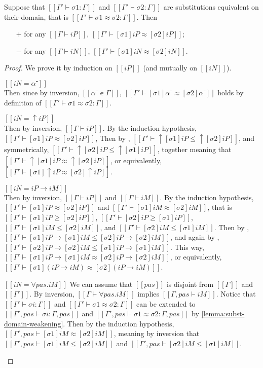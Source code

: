\begin{lemma}
  \label{lemma:equiv-subst-on-same-term}
  Suppose that $[[Γ' ⊢ σ1 : Γ]]$ and $[[Γ' ⊢ σ2 : Γ]]$
  are substitutions equivalent on their domain, that is $[[Γ' ⊢ σ1 ≈ σ2 : Γ]]$.
  Then
  \begin{itemize}
    \item[$+$] for any $[[Γ ⊢ iP]]$, $[[Γ' ⊢ [σ1]iP ≈ [σ2]iP]]$;
    \item[$-$] for any $[[Γ ⊢ iN]]$, $[[Γ' ⊢ [σ1]iN ≈ [σ2]iN]]$.
  \end{itemize}
\end{lemma}
\begin{proof}
  We prove it by induction on $[[iP]]$ (and mutually on $[[iN]]$).
  \begin{caseof}
    \item $[[iN = α⁻]]$\\
      Then since by inversion, $[[α⁻ ∊ Γ]]$, 
      $[[Γ' ⊢ [σ1]α⁻ ≈ [σ2]α⁻]]$ holds by definition of $[[Γ' ⊢ σ1 ≈ σ2 : Γ]]$.
    \item $[[iN = ↑iP]]$\\
      Then by inversion, $[[Γ ⊢ iP]]$.
      By the induction hypothesis, $[[Γ' ⊢ [σ1]iP ≈ [σ2]iP]]$, 
      Then by , 
      $[[Γ' ⊢ ↑[σ1]iP ≤ ↑[σ2]iP]]$, and symmetrically, $[[Γ' ⊢ ↑[σ2]iP ≤ ↑[σ1]iP]]$,
      together meaning that $[[Γ' ⊢ ↑[σ1]iP ≈ ↑[σ2]iP]]$,
      or equivalently, $[[Γ' ⊢ [σ1]↑iP ≈ [σ2]↑iP]]$.
    \item $[[iN = iP → iM]]$\\
      Then by inversion, $[[Γ ⊢ iP]]$ and $[[Γ ⊢ iM]]$.
      By the induction hypothesis, $[[Γ' ⊢ [σ1]iP ≈ [σ2]iP]]$ and
      $[[Γ' ⊢ [σ1]iM ≈ [σ2]iM]]$,
      that is $[[Γ' ⊢ [σ1]iP ≥ [σ2]iP]]$, $[[Γ' ⊢ [σ2]iP ≥ [σ1]iP]]$,
      $[[Γ' ⊢ [σ1]iM ≤ [σ2]iM]]$, and $[[Γ' ⊢ [σ2]iM ≤ [σ1]iM]]$.
      Then by , $[[Γ' ⊢ [σ1]iP → [σ1]iM ≤ [σ2]iP → [σ2]iM]]$, 
      and again by , $[[Γ' ⊢ [σ2]iP → [σ2]iM ≤ [σ1]iP → [σ1]iM]]$.
      This way, $[[Γ' ⊢ [σ1]iP → [σ1]iM ≈ [σ2]iP → [σ2]iM]]$,
      or equivalently, $[[Γ' ⊢ [σ1](iP → iM) ≈ [σ2](iP → iM)]]$.
    \item $[[iN = ∀pas.iM]]$
      We can assume that $[[pas]]$ is disjoint from $[[Γ]]$ and $[[Γ']]$.
      By inversion, $[[Γ ⊢ ∀pas.iM]]$ implies $[[Γ, pas ⊢ iM]]$.
      Notice that $[[Γ' ⊢ σi : Γ]]$ and 
      $[[Γ' ⊢ σ1 ≈ σ2 : Γ]]$
      can be extended to 
      $[[Γ', pas ⊢ σi : Γ, pas]]$
      and 
      $[[Γ', pas ⊢ σ1 ≈ σ2 : Γ, pas]]$
      by \cref{lemma:subst-domain-weakening}.
      Then by the induction hypothesis,
      $[[Γ', pas ⊢ [σ1]iM ≈ [σ2]iM]]$,
      meaning by inversion that
      $[[Γ', pas ⊢ [σ1]iM ≤ [σ2]iM]]$ and 
      $[[Γ', pas ⊢ [σ2]iM ≤ [σ1]iM]]$.


\end{caseof}
\end{proof}
